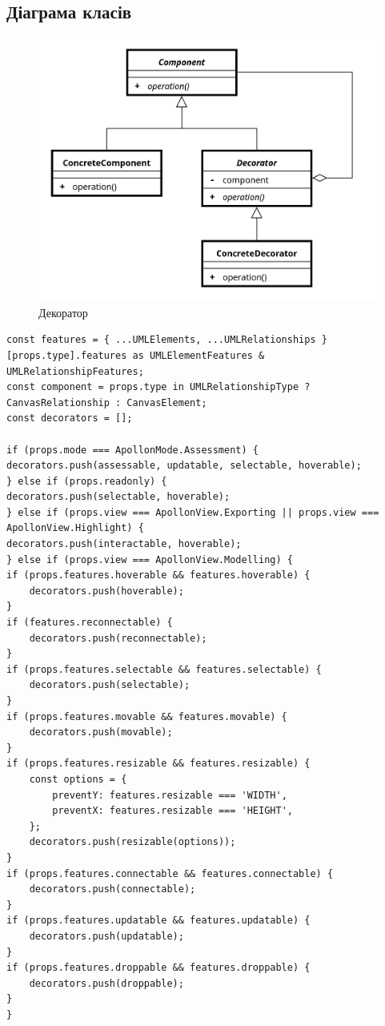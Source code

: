 \documentclass[oneside,14pt]{extarticle}
\begin{document}
\begin{normalsize}
    \subsection*{Діаграма класів}
    \begin{figure}[H]
    	\centering
    	\includegraphics[width=\columnwidth]{1}
    	\caption{Декоратор}
    \end{figure}
    \begin{small}
    	\begin{lstlisting}
const features = { ...UMLElements, ...UMLRelationships }[props.type].features as UMLElementFeatures &
UMLRelationshipFeatures;
const component = props.type in UMLRelationshipType ? CanvasRelationship : CanvasElement;
const decorators = [];

if (props.mode === ApollonMode.Assessment) {
decorators.push(assessable, updatable, selectable, hoverable);
} else if (props.readonly) {
decorators.push(selectable, hoverable);
} else if (props.view === ApollonView.Exporting || props.view === ApollonView.Highlight) {
decorators.push(interactable, hoverable);
} else if (props.view === ApollonView.Modelling) {
if (props.features.hoverable && features.hoverable) {
	decorators.push(hoverable);
}
if (features.reconnectable) {
	decorators.push(reconnectable);
}
if (props.features.selectable && features.selectable) {
	decorators.push(selectable);
}
if (props.features.movable && features.movable) {
	decorators.push(movable);
}
if (props.features.resizable && features.resizable) {
	const options = {
		preventY: features.resizable === 'WIDTH',
		preventX: features.resizable === 'HEIGHT',
	};
	decorators.push(resizable(options));
}
if (props.features.connectable && features.connectable) {
	decorators.push(connectable);
}
if (props.features.updatable && features.updatable) {
	decorators.push(updatable);
}
if (props.features.droppable && features.droppable) {
	decorators.push(droppable);
}
}


\end{lstlisting}
\end{small}
\end{normalsize}
\end{document}

